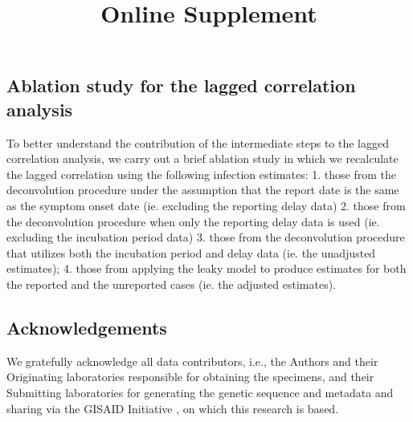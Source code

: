 \documentclass{article}
\newcommand{\beginsupplement}{
  \setcounter{table}{1}  
  \renewcommand{\thetable}{S\arabic{table}} 
  \setcounter{figure}{1} 
  \renewcommand{\thefigure}{S\arabic{figure}}
  \setcounter{section}{0} 
  \renewcommand{\thesection}{S\arabic{section}}
}
\begin{document}

\subsection{Ablation study for the lagged correlation analysis} 

To better understand the contribution of the intermediate steps to the lagged 
correlation analysis, we carry out a brief ablation study in which we recalculate the 
lagged correlation using the following infection estimates: 1. those from the
deconvolution procedure under the assumption that the report date is the 
same as the symptom onset date (ie. excluding
the reporting delay data) 2. those from the deconvolution procedure when only the
reporting delay data is used (ie. excluding the incubation period data) 3. those from
the deconvolution procedure that utilizes both the incubation period and delay data 
(ie. the unadjusted estimates); 4. those from applying the leaky model to produce
estimates for both the reported and the unreported cases (ie. the adjusted estimates).

\subsection*{Acknowledgements}

We gratefully acknowledge all data contributors, i.e., the Authors and their
Originating laboratories responsible for obtaining the specimens, and their
Submitting laboratories for generating the genetic sequence and metadata and
sharing via the GISAID Initiative \citep{elbe2017data}, on which this research
is based.



\newpage


\newpage
\beginsupplement
\title{Online Supplement} 
\maketitle
\end{document}
